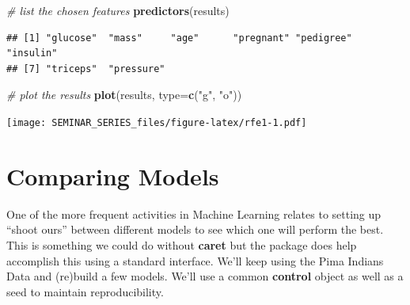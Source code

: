 \documentclass[]{book}
\newenvironment{Shaded}{\begin{snugshade}}{\end{snugshade}}
\newcommand{\KeywordTok}[1]{\textcolor[rgb]{0.13,0.29,0.53}{\textbf{#1}}}
\newcommand{\DataTypeTok}[1]{\textcolor[rgb]{0.13,0.29,0.53}{#1}}
\newcommand{\StringTok}[1]{\textcolor[rgb]{0.31,0.60,0.02}{#1}}
\newcommand{\CommentTok}[1]{\textcolor[rgb]{0.56,0.35,0.01}{\textit{#1}}}
\newcommand{\NormalTok}[1]{#1}
\begin{document}
\begin{Shaded}
\begin{Highlighting}[]
\CommentTok{# list the chosen features}
\KeywordTok{predictors}\NormalTok{(results)}
\end{Highlighting}
\end{Shaded}

\begin{verbatim}
## [1] "glucose"  "mass"     "age"      "pregnant" "pedigree" "insulin" 
## [7] "triceps"  "pressure"
\end{verbatim}

\begin{Shaded}
\begin{Highlighting}[]
\CommentTok{# plot the results}
\KeywordTok{plot}\NormalTok{(results, }\DataTypeTok{type=}\KeywordTok{c}\NormalTok{(}\StringTok{"g"}\NormalTok{, }\StringTok{"o"}\NormalTok{))}
\end{Highlighting}
\end{Shaded}

\texttt{[image: SEMINAR\_SERIES\_files/figure-latex/rfe1-1.pdf]}

\chapter{Comparing Models}\label{comparing-models}

One of the more frequent activities in Machine Learning relates to
setting up ``shoot ours'' between different models to see which one will
perform the best. This is something we could do without \textbf{caret}
but the package does help accomplish this using a standard interface.
We'll keep using the Pima Indians Data and (re)build a few models. We'll
use a common \textbf{control} object as well as a seed to maintain
reproducibility.
\end{document}
